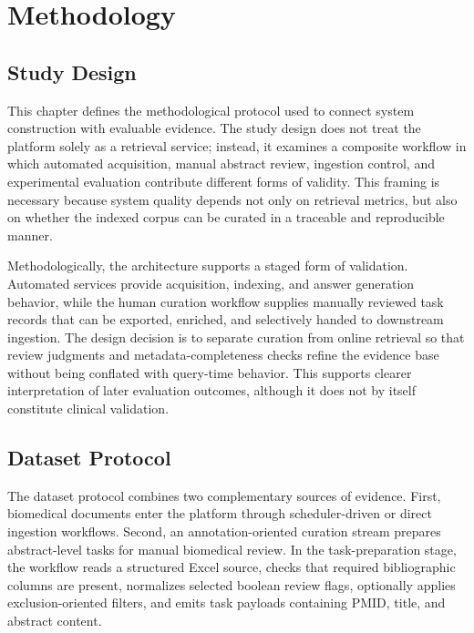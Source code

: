 \chapter{Methodology}
\label{chap:methodology}

\section{Study Design}

This chapter defines the methodological protocol used to connect system construction with evaluable evidence. The study design does not treat the platform solely as a retrieval service; instead, it examines a composite workflow in which automated acquisition, manual abstract review, ingestion control, and experimental evaluation contribute different forms of validity. This framing is necessary because system quality depends not only on retrieval metrics, but also on whether the indexed corpus can be curated in a traceable and reproducible manner.

Methodologically, the architecture supports a staged form of validation. Automated services provide acquisition, indexing, and answer generation behavior, while the human curation workflow supplies manually reviewed task records that can be exported, enriched, and selectively handed to downstream ingestion. The design decision is to separate curation from online retrieval so that review judgments and metadata-completeness checks refine the evidence base without being conflated with query-time behavior. This supports clearer interpretation of later evaluation outcomes, although it does not by itself constitute clinical validation.

\section{Dataset Protocol}

The dataset protocol combines two complementary sources of evidence. First, biomedical documents enter the platform through scheduler-driven or direct ingestion workflows. Second, an annotation-oriented curation stream prepares abstract-level tasks for manual biomedical review. In the task-preparation stage, the workflow reads a structured Excel source, checks that required bibliographic columns are present, normalizes selected boolean review flags, optionally applies exclusion-oriented filters, and emits task payloads containing PMID, title, and abstract content.

